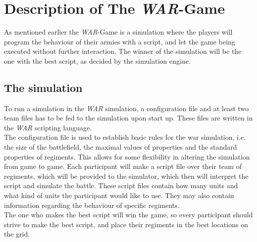 
\section{ Description of The \textit{WAR}-Game }
\label{sec:describeWAR}
As mentioned earlier the \textit{WAR}-Game is a simulation where the players will program the behaviour of their armies with a script, and let the game being executed without further interaction. The winner of the simulation will be the one with the best script, as decided by the simulation engine. \\
	\subsection{The simulation}
		To run a simulation in the \textit{WAR} simulation, a configuration file and at least two team files has to be fed to the simulation upon start up. 
		These files are written in the \textit{WAR} scripting language.
		\\
		The configuration file is used to establish basic rules for the war simulation, i.e. the size of the battlefield, the maximal values of properties and the standard properties of regiments.
		This allows for some flexibility in altering the simulation from game to game.
		Each participant will make a script file over their team of regiments, which will be provided to the simulator, 
		which then will interpret the script and simulate the battle. 
		These script files contain how many units and what kind of units the participant would like to use. 
		They may also contain information regarding the behaviour of specific regiments. 
		\\
		The one who makes the best script will win the game, so every participant should strive to make the best script, 
		and place their regiments in the best locations on the grid.
		\\

